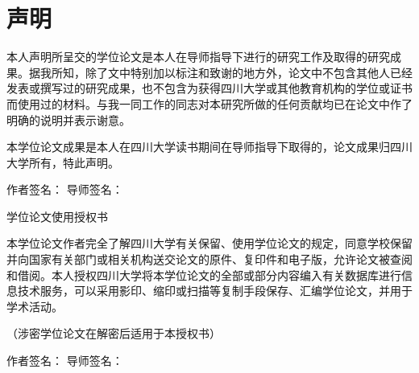 
\chapter*{声\hspace{0.8cm}明}

本人声明所呈交的学位论文是本人在导师指导下进行的研究工作及取得的研究成果。据我所知，除了文中特别加以标注和致谢的地方外，论文中不包含其他人已经发表或撰写过的研究成果，也不包含为获得四川大学或其他教育机构的学位或证书而使用过的材料。与我一同工作的同志对本研究所做的任何贡献均已在论文中作了明确的说明并表示谢意。

本学位论文成果是本人在四川大学读书期间在导师指导下取得的，论文成果归四川大学所有，特此声明。

\vspace{20pt}

作者签名：\hspace{3cm}
\hfill
导师签名：\hspace{3cm}

\vspace{0.5cm}

\begin{flushright}
\end{flushright}

\vspace{20pt}

{\centering
{}\heiti 学位论文使用授权书\par
}

本学位论文作者完全了解四川大学有关保留、使用学位论文的规定，同意学校保留并向国家有关部门或相关机构送交论文的原件、复印件和电子版，允许论文被查阅和借阅。本人授权四川大学将本学位论文的全部或部分内容编入有关数据库进行信息技术服务，可以采用影印、缩印或扫描等复制手段保存、汇编学位论文，并用于学术活动。

（涉密学位论文在解密后适用于本授权书）

\vspace{20pt}

作者签名：\hspace{3cm}
\hfill
导师签名：\hspace{3cm}

\vspace{0.5cm}

\begin{flushright}
\end{flushright}
